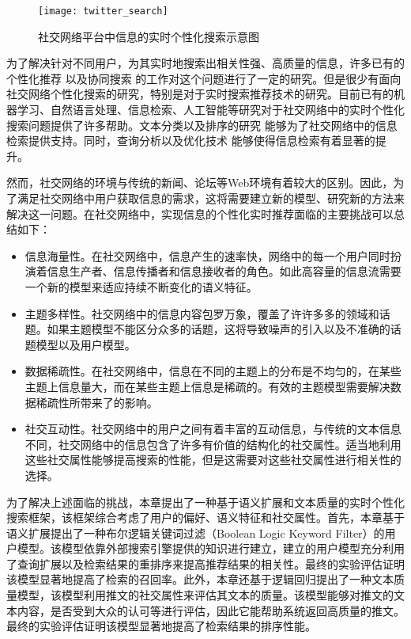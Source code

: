 \begin{figure}[!htbp] %
  \centering
  \texttt{[image: twitter\_search]}
  \caption{社交网络平台中信息的实时个性化搜索示意图}
  \label{fig:twitter_search}
\end{figure}

为了解决针对不同用户，为其实时地搜索出相关性强、高质量的信息，许多已有的个性化推荐 以及协同搜索 的工作对这个问题进行了一定的研究。但是很少有面向社交网络个性化搜索的研究，特别是对于实时搜索推荐技术的研究。目前已有的机器学习、自然语言处理、信息检索、人工智能等研究对于社交网络中的实时个性化搜索问题提供了许多帮助。文本分类以及排序的研究 能够为了社交网络中的信息检索提供支持。同时，查询分析以及优化技术 能够使得信息检索有着显著的提升。

然而，社交网络的环境与传统的新闻、论坛等Web环境有着较大的区别。因此，为了满足社交网络中用户获取信息的需求，这将需要建立新的模型、研究新的方法来解决这一问题。在社交网络中，实现信息的个性化实时推荐面临的主要挑战可以总结如下：
\begin{itemize}
  \item 信息海量性。在社交网络中，信息产生的速率快，网络中的每一个用户同时扮演着信息生产者、信息传播者和信息接收者的角色。如此高容量的信息流需要一个新的模型来适应持续不断变化的语义特征。
  \item 主题多样性。社交网络中的信息内容包罗万象，覆盖了许许多多的领域和话题。如果主题模型不能区分众多的话题，这将导致噪声的引入以及不准确的话题模型以及用户模型。
  \item 数据稀疏性。在社交网络中，信息在不同的主题上的分布是不均匀的，在某些主题上信息量大，而在某些主题上信息是稀疏的。有效的主题模型需要解决数据稀疏性所带来了的影响。
  \item 社交互动性。社交网络中的用户之间有着丰富的互动信息，与传统的文本信息不同，社交网络中的信息包含了许多有价值的结构化的社交属性。适当地利用这些社交属性能够提高搜索的性能，但是这需要对这些社交属性进行相关性的选择。
\end{itemize}

为了解决上述面临的挑战，本章提出了一种基于语义扩展和文本质量的实时个性化搜索框架，该框架综合考虑了用户的偏好、语义特征和社交属性。首先，本章基于语义扩展提出了一种布尔逻辑关键词过滤（Boolean Logic Keyword Filter）的用户模型。该模型依靠外部搜索引擎提供的知识进行建立，建立的用户模型充分利用了查询扩展以及检索结果的重排序来提高推荐结果的相关性。最终的实验评估证明该模型显著地提高了检索的召回率。此外，本章还基于逻辑回归提出了一种文本质量模型，该模型利用推文的社交属性来评估其文本的质量。该模型能够对推文的文本内容，是否受到大众的认可等进行评估，因此它能帮助系统返回高质量的推文。最终的实验评估证明该模型显著地提高了检索结果的排序性能。

